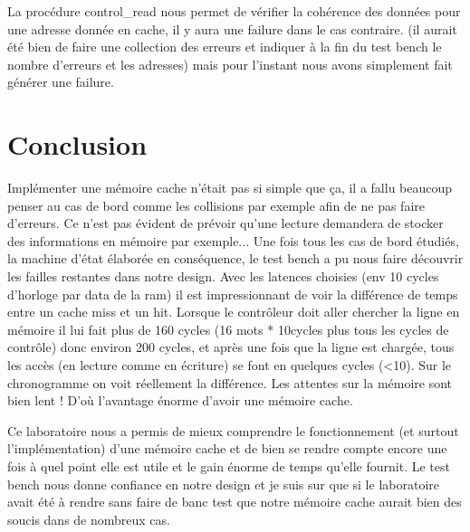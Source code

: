 \documentclass[10pt,a4paper]{article}
\begin{document}
La procédure control\_read nous permet de vérifier la cohérence des données pour une adresse donnée en cache, il y aura une failure dans le cas contraire. (il aurait été bien de faire une collection des erreurs et indiquer à la fin du test bench le nombre d'erreurs et les adresses) mais pour l'instant nous avons simplement fait générer une failure.

\section{Conclusion}
Implémenter une mémoire cache n'était pas si simple que ça, il a fallu beaucoup penser au cas de bord comme les collisions par exemple afin de ne pas faire d'erreurs. Ce n'est pas évident de prévoir qu'une lecture demandera de stocker des informations en mémoire par exemple... Une fois tous les cas de bord étudiés, la machine d'état élaborée en conséquence, le test bench a pu nous faire découvrir les failles restantes dans notre design. Avec les latences choisies (env 10 cycles d'horloge par data de la ram) il est impressionnant de voir la différence de temps entre un cache miss et un hit. Lorsque le contrôleur doit aller chercher la ligne en mémoire il lui fait plus de 160 cycles (16 mots * 10cycles plus tous les cycles de contrôle) donc environ 200 cycles, et après une fois que la ligne est chargée, tous les accès (en lecture comme en écriture) se font en quelques cycles (<10). Sur le chronogramme on voit réellement la différence. Les attentes sur la mémoire sont bien lent ! D'où l'avantage énorme d'avoir une mémoire cache.

Ce laboratoire nous a permis de mieux comprendre le fonctionnement (et surtout l'implémentation) d'une mémoire cache et de bien se rendre compte encore une fois à quel point elle est utile et le gain énorme de temps qu'elle fournit. Le test bench nous donne confiance en notre design et je suis sur que si le laboratoire avait été à rendre sans faire de banc test que notre mémoire cache aurait bien des soucis dans de nombreux cas.
\end{document}
